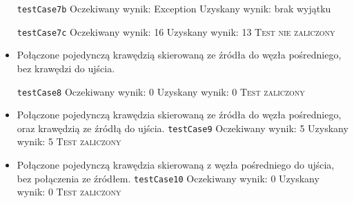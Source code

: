 \begin{itemize}[nosep]
    \texttt{testCase7b}
    Oczekiwany wynik: Exception
    Uzyskany wynik: brak wyjątku

    \texttt{testCase7c}
    Oczekiwany wynik: 16
    Uzyskany wynik: 13
    \textsc{Test nie zaliczony}

    \item Połączone pojedynczą krawędzią skierowaną ze źródła do węzła
    pośredniego, bez krawędzi do ujścia.

    \texttt{testCase8}
    Oczekiwany wynik: 0
    Uzyskany wynik: 0
    \textsc{Test zaliczony}

    \item Połączone pojedynczą krawędzia skierowaną ze źródła do węzła
    pośredniego, oraz krawędzią ze źródłą do ujścia.
    \texttt{testCase9}
    Oczekiwany wynik: 5
    Uzyskany wynik: 5
    \textsc{Test zaliczony}

    \item Połączone pojedynczą krawędzia skierowaną z węzła pośredniego do
    ujścia, bez połączenia ze źródłem.
    \texttt{testCase10}
    Oczekiwany wynik: 0
    Uzyskany wynik: 0
    \textsc{Test zaliczony}
\end{itemize}


